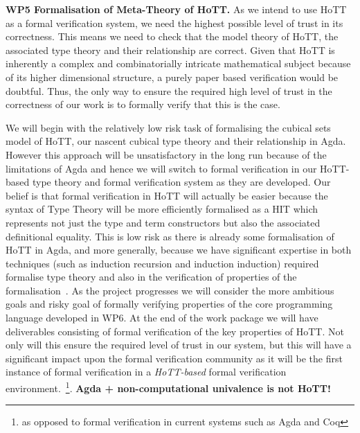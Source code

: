 \documentclass[a4paper,11pt]{article}
\begin{document}
{\bf WP5 Formalisation of Meta-Theory of HoTT.}  As we intend to use
HoTT as a formal verification system, we need the highest possible
level of trust in its correctness. This means we need to check that
the model theory of HoTT, the associated type theory and their
relationship are correct. Given that HoTT is inherently a complex and
combinatorially intricate mathematical subject because of its higher
dimensional structure, a purely paper based verification would be
doubtful.  Thus, the only way to ensure the required high level of
trust in the correctness of our work is to formally verify that this
is the case.


We will begin with the relatively low risk task of formalising the
cubical sets model of HoTT, our nascent cubical type theory and their
relationship in Agda. However this approach will be unsatisfactory in
the long run because of the limitations of Agda and hence we will
switch to formal verification in our HoTT-based type theory and formal
verification system as they are developed. Our belief is that formal
verification in HoTT will actually be easier because the syntax of
Type Theory will be more efficiently formalised as a HIT which
represents not just the type and term constructors but also the
associated definitional equality. This is low risk as there is already
some formalisation of HoTT in Agda, and more generally, because we
have significant expertise in both techniques (such as induction
recursion and induction induction) required formalise type theory and
also in the verification of properties of the formalisation~\cite{}.
As the project progresses we will consider the more ambitious goals
and risky goal of formally verifying properties of the core programming
language developed in WP6. At the end of the work package we will have
deliverables consisting of formal verification of the key properties
of HoTT. Not only will this ensure the required level of trust in our
system, but this will have a significant impact upon the formal
verification community as it will be the first instance of formal
verification in a {\em HoTT-based} formal verification
environment.~\footnote{as opposed to formal verification in current
  systems such as Agda and Coq}. {\bf Agda + non-computational
  univalence is not HoTT!}
  




\end{document}
